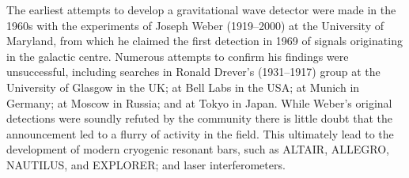 
The earliest attempts to develop a gravitational wave detector were
made in the 1960s with the experiments of Joseph Weber (1919--2000) at
the University of Maryland, from which he claimed the first detection
in 1969\cite{1969PhRvL..22.1320W,1970PhRvL..24..276W} of signals
originating in the galactic centre\cite{1970PhRvL..25..180W}. Numerous
attempts to confirm his findings were unsuccessful, including searches
in Ronald Drever's (1931--1917) group at the University of Glasgow
\cite{1973Natur.246..340D} in the UK; at Bell Labs
\cite{1973PhRvL..31..173L,1973PhRvL..31..176G,1974PhRvL..33..794L} in
the USA; at Munich\cite{1975NCimL..12..111B,1975NCimL..12..111B} in
Germany; at Moscow\cite{1973PhLA...45..271B} in Russia; and at
Tokyo\cite{1975PhRvL..35..890H} in Japan. While Weber's original
detections were soundly refuted by the community there is little doubt
that the announcement led to a flurry of activity in the field. This
ultimately lead to the development of modern cryogenic resonant bars,
such as ALTAIR\cite{1992NCimC..15..943B},
ALLEGRO\cite{2000IJMPD...9..229M}, NAUTILUS\cite{1997APh.....7..231A},
and EXPLORER\cite{1993PhRvD..47..362A}; and laser interferometers.




